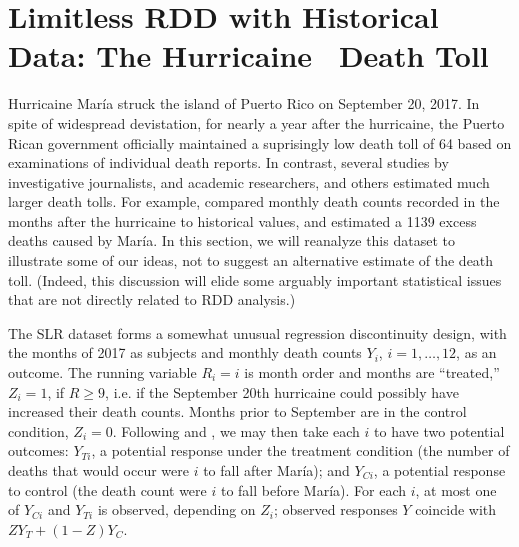 
\section{Limitless RDD with Historical Data: The Hurricaine \maria\
Death Toll}\label{sec:maria}







Hurricaine Mar\'{i}a struck the island of Puerto Rico on September 20,
2017.
In spite of widespread devistation, for nearly a year after the
hurricaine, the Puerto Rican government officially maintained a
suprisingly low death toll of 64 based on examinations of individual
death reports.
In contrast, several studies by investigative journalists, and academic
researchers, and others estimated much larger death tolls.
For example, \citet[][; henceforth SLH]{santos2018use} compared monthly death counts recorded in the
months after the hurricaine to historical values, and estimated a 1139 excess
deaths caused by Mar\'{i}a.
In this section, we will reanalyze this dataset to illustrate some
of our ideas, not to suggest an alternative estimate of the death
toll.
(Indeed, this discussion will elide some arguably important
statistical issues that are not directly related to RDD analysis.)

The SLR dataset forms a somewhat unusual regression
discontinuity design, with the months of 2017 as subjects and monthly death
counts $Y_i$, $i=1,\dots,12$, as an outcome.
The running variable $R_i=i$ is month order and months are
``treated,'' $Z_i=1$,
if $R\ge 9$, i.e. if the September 20th hurricaine could possibly have
increased their death counts.
Months prior to September are in the control condition, $Z_i=0$.
Following \citet{neyman:1923} and \citet{rubin1974estimating}, we may
then take each $i$ to have two potential outcomes: $Y_{Ti}$, a potential
response under the treatment condition (the number of deaths that
would occur were $i$ to fall after Mar\'{i}a); and $Y_{Ci}$, a potential response to
control (the death count were $i$ to fall before Mar\'{i}a).
For each $i$, at most one of $Y_{Ci}$ and $Y_{Ti}$ is
observed, depending on $Z_i$; observed responses $Y$ coincide with
$ZY_{T}+(1-Z)Y_{C}$.

